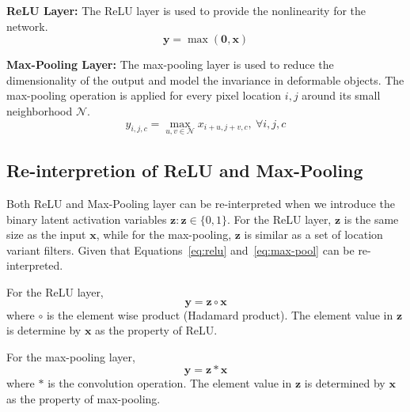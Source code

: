 \textbf{ReLU Layer:}
The ReLU layer is used to provide the nonlinearity for the network.
\begin{equation}
\mathbf{y} = \max (\mathbf{0}, \mathbf{x})
\label{eq:relu}
\end{equation} 

\textbf{Max-Pooling Layer:}
The max-pooling layer is used to reduce the dimensionality of the output and model the invariance in deformable objects. The max-pooling operation is applied for every pixel location $i,j$ around its small neighborhood $\mathcal{N}$.
\begin{equation}
y_{i,j,c} = \max_{u,v \in \mathcal{N}} x_{i+u, j+v, c},\ \forall i, j, c
\label{eq:max-pool}
\end{equation}

\subsection{Re-interpretion of ReLU and Max-Pooling}
Both ReLU and Max-Pooling layer can be re-interpreted when we introduce the binary latent activation variables $\mathbf{z}: \mathbf{z} \in \{0, 1\}$. For the ReLU layer, $\mathbf{z}$ is the same size as the input $\mathbf{x}$, while for the max-pooling, $\mathbf{z}$ is similar as a set of location variant filters. Given that Equations~\ref{eq:relu} and~\ref{eq:max-pool} can be re-interpreted.

For the ReLU layer, 
\begin{equation}
\mathbf{y} = \mathbf{z} \circ \mathbf{x}
\end{equation}
where $\circ$ is the element wise product (Hadamard product). The element value in $\mathbf{z}$ is determine by $\mathbf{x}$ as the property of ReLU.

For the max-pooling layer,
\begin{equation}
\mathbf{y} = \mathbf{z} * \mathbf{x}
\end{equation}
where $*$ is the convolution operation. The element value in $\mathbf{z}$ is determined by $\mathbf{x}$ as the property of max-pooling.

